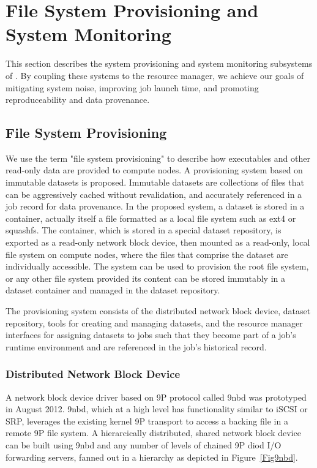 \section{File System Provisioning and System Monitoring}

This section describes the system provisioning and system monitoring
subsystems of \ngrm.  By coupling these systems to the resource manager,
we achieve our goals of mitigating system noise, improving job launch time,
and promoting reproduceability and data provenance.

\subsection{File System Provisioning}

We use the term "file system provisioning" to describe how executables
and other read-only data are provided to compute nodes.
A provisioning system based on immutable datasets is proposed.
Immutable datasets are collections of files that can be aggressively cached
without revalidation,
and accurately referenced in a job record for data provenance.
In the proposed system, a dataset is stored in a container,
actually itself a file formatted as a local file system such as ext4 or
squashfs.  The container, which is stored in a special dataset repository,
is exported as a read-only network block device,
then mounted as a read-only, local file system on compute nodes,
where the files that comprise the dataset are individually accessible.
The system can be used to provision the root file system,
or any other file system provided its content can be stored immutably
in a dataset container and managed in the dataset repository.

The provisioning system consists of the
distributed network block device,
dataset repository,
tools for creating and managing datasets,
and the resource manager interfaces for assigning datasets to jobs
such that they become part of a job's runtime environment and
are referenced in the job's historical record.


\subsubsection{Distributed Network Block Device}

A network block device driver based on 9P protocol called 9nbd\cite{9nbd}
was prototyped in August 2012.
9nbd, which at a high level has functionality similar to iSCSI or SRP,
leverages the existing kernel 9P transport to access a backing file
in a remote 9P file system.
A hierarcically distributed, shared network block device can be built
using 9nbd and any number of levels of chained 9P diod\cite{diod}
I/O forwarding servers, fanned out in a hierarchy as depicted in
Figure~\ref{Fig9nbd}.

